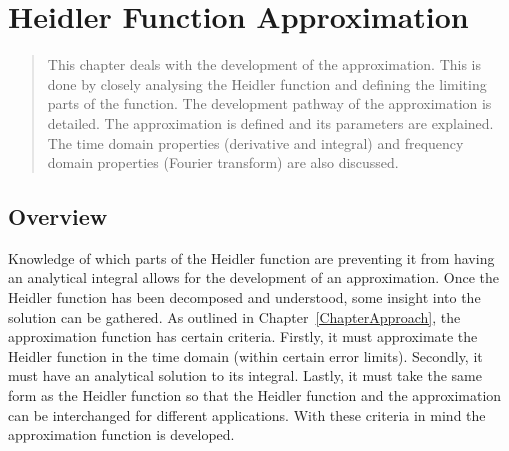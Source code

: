
\chapter{Heidler Function Approximation} %

\label{ChapterApprox} %

\begin{quote}
This chapter deals with the development of the approximation. This is done by closely analysing the Heidler function and defining the limiting parts of the function. The development pathway of the approximation is detailed. The approximation is defined and its parameters are explained. The time domain properties (derivative and integral) and frequency domain properties (Fourier transform) are also discussed.
\end{quote}


\section{Overview}
\label{sec:approx_overview}
Knowledge of which parts of the Heidler function are preventing it from having an analytical integral allows for the development of an approximation. Once the Heidler function has been decomposed and understood, some insight into the solution can be gathered. As outlined in Chapter~\ref{ChapterApproach}, the approximation function has certain criteria. Firstly, it must approximate the Heidler function in the time domain (within certain error limits). Secondly, it must have an analytical solution to its integral. Lastly, it must take the same form as the Heidler function so that the Heidler function and the approximation can be interchanged for different applications. With these criteria in mind the approximation function is developed.


